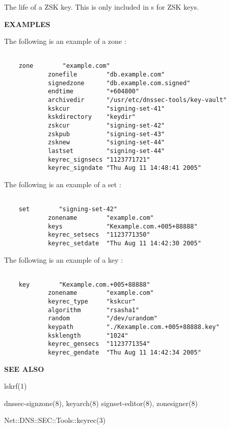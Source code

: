 The life of a ZSK key.  This is only included in s for ZSK keys.

{\bf EXAMPLES}

The following is an example of a zone :

\begin{verbatim}

    zone        "example.com"
            zonefile        "db.example.com"
            signedzone      "db.example.com.signed"
            endtime         "+604800"
            archivedir      "/usr/etc/dnssec-tools/key-vault"
            kskcur          "signing-set-41"
            kskdirectory    "keydir"
            zskcur          "signing-set-42"
            zskpub          "signing-set-43"
            zsknew          "signing-set-44"
            lastset         "signing-set-44"
            keyrec_signsecs "1123771721"
            keyrec_signdate "Thu Aug 11 14:48:41 2005"

\end{verbatim}

The following is an example of a set :

\begin{verbatim}

    set        "signing-set-42"
            zonename        "example.com"
            keys            "Kexample.com.+005+88888"
            keyrec_setsecs  "1123771350"
            keyrec_setdate  "Thu Aug 11 14:42:30 2005"

\end{verbatim}

The following is an example of a key :

\begin{verbatim}

    key        "Kexample.com.+005+88888"
            zonename        "example.com"
            keyrec_type     "kskcur"
            algorithm       "rsasha1"
            random          "/dev/urandom"
            keypath         "./Kexample.com.+005+88888.key"
            ksklength       "1024"
            keyrec_gensecs  "1123771354"
            keyrec_gendate  "Thu Aug 11 14:42:34 2005"

\end{verbatim}

{\bf SEE ALSO}

lskrf(1)

dnssec-signzone(8),
keyarch(8)
signset-editor(8),
zonesigner(8)

Net::DNS::SEC::Tools::keyrec(3)

